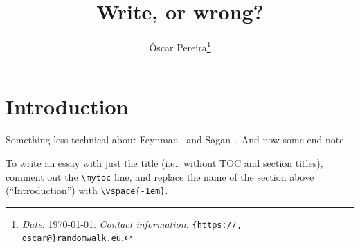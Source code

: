\documentclass[a4paper,12pt,dvipsnames*]{article}
\title{
Write, or wrong?
}
\author{
  Óscar Pereira\footnote{\emph{Date:} \today. \emph{Contact information:} \texttt{\{https://, oscar@\}randomwalk.eu}.}
}
\date{\vspace{-4em}}
\begin{document}
\maketitle

\mytoc

\section{Introduction}
  \label{sec:intro}
  Something less technical about Feynman~\cite{Feynman74} and Sagan~\cite{Sagan}. And now some end note.

  To write an essay with just the title (i.e., without TOC and section titles), comment out the \verb+\mytoc+ line, and replace the name of the section above (``Introduction'') with \verb+\vspace{-1em}+.

\printendnotes

{}


\end{document}
